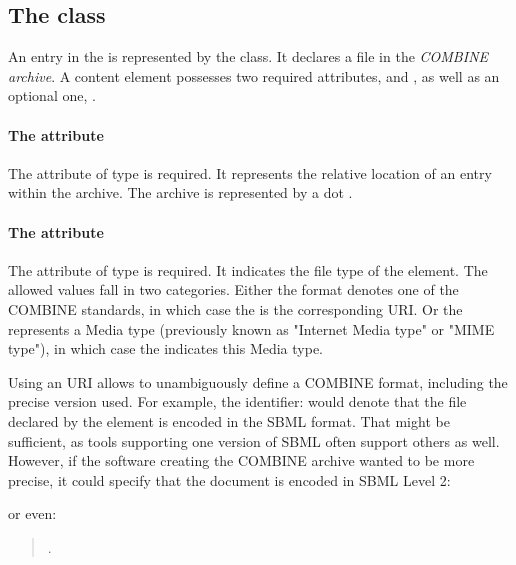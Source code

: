 \subsection{The  class}
\label{content-class}
An entry in the \OmexManifest is represented by the \Content class. It declares a file in the \emph{COMBINE archive}. A content element possesses two required attributes,  and , as well as an optional one, . 

\paragraph{The  attribute}
The  attribute of type 
 is required. It represents the relative location of an entry within the 
archive. The archive is represented by a dot . 

\paragraph{The  attribute}
The  attribute of type  is required. It 
indicates the file type of the \Content element. The allowed values fall in two categories. Either the format 
denotes one of the COMBINE standards, in which case the  
is the corresponding  URI. Or the 
 represents a Media type \citep{rfc2046} (previously known as "Internet Media type" or "MIME type"), in which case the  indicates this Media type.

Using an  URI allows to unambiguously define a COMBINE format, including the precise version used. For example, the identifier:  would denote that the file declared by the \Content 
element is encoded in the SBML format. That might be sufficient, as tools supporting one version of SBML often
support others as well. However, if the software creating the COMBINE archive wanted to be more precise, it could specify that the document is encoded in SBML Level 2: 

\begin{quote}
\end{quote}

or even:

\begin{quote}
.
\end{quote}


